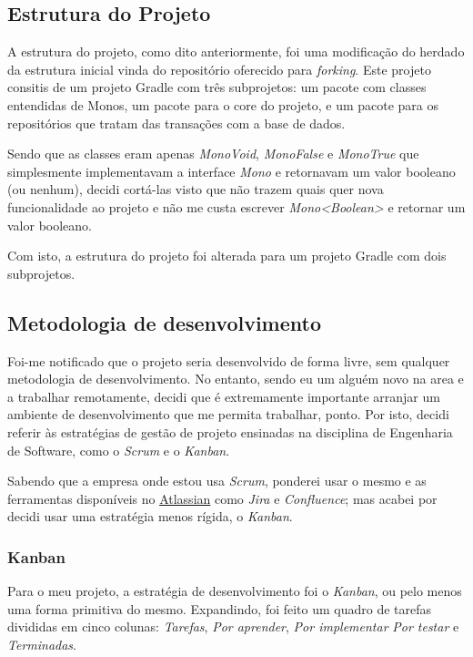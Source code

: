 \subsection{Estrutura do Projeto}

A estrutura do projeto, como dito anteriormente, foi uma modificação do herdado da estrutura inicial vinda do repositório oferecido para \textit{forking}. Este projeto consitis de um projeto Gradle com três subprojetos: um pacote com classes entendidas de Monos, um pacote para o core do projeto, e um pacote para os repositórios que tratam das transações com a base de dados.

Sendo que as classes eram apenas \textit{MonoVoid}, \textit{MonoFalse} e \textit{MonoTrue} que simplesmente implementavam a interface \textit{Mono} e retornavam um valor booleano (ou nenhum), decidi cortá-las visto que não trazem quais quer nova funcionalidade ao projeto e não me custa escrever \textit{Mono<Boolean>} e retornar um valor booleano.

Com isto, a estrutura do projeto foi alterada para um projeto Gradle com dois subprojetos.

\subsection{Metodologia de desenvolvimento}

Foi-me notificado que o projeto seria desenvolvido de forma livre, sem qualquer metodologia de desenvolvimento. No entanto, sendo eu um alguém novo na area e a trabalhar remotamente, decidi que é extremamente importante arranjar um ambiente de desenvolvimento que me permita trabalhar, ponto. Por isto, decidi referir às estratégias de gestão de projeto ensinadas na disciplina de Engenharia de Software, como o \textit{Scrum} e o \textit{Kanban}.

Sabendo que a empresa onde estou usa \textit{Scrum}, ponderei usar o mesmo e as ferramentas disponíveis no \href{https://www.atlassian.com/}{Atlassian} como \textit{Jira} e \textit{Confluence}; mas acabei por decidi usar uma estratégia menos rígida, o \textit{Kanban}.

\newpage

\subsubsection{Kanban}

Para o meu projeto, a estratégia de desenvolvimento foi o \textit{Kanban}, ou pelo menos uma forma primitiva do mesmo. Expandindo, foi feito um quadro de tarefas divididas em cinco colunas: \textit{Tarefas}, \textit{Por aprender}, \textit{Por implementar} \textit{Por testar} e \textit{Terminadas}.

